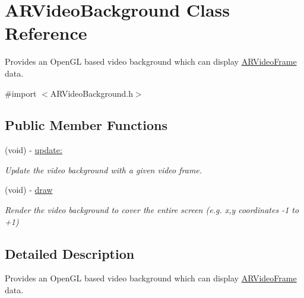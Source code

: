 \hypertarget{interface_a_r_video_background}{\section{A\-R\-Video\-Background Class Reference}
\label{interface_a_r_video_background}
}


Provides an Open\-G\-L based video background which can display \hyperlink{struct_a_r_video_frame}{A\-R\-Video\-Frame} data.  




{\ttfamily \#import $<$A\-R\-Video\-Background.\-h$>$}

\subsection*{Public Member Functions}
\begin{DoxyCompactItemize}
\item 
(void) -\/ \hyperlink{interface_a_r_video_background_a912dbfd42208bacb82411d537e80c8b9}{update\-:}
\begin{DoxyCompactList}\small\item\em Update the video background with a given video frame. \end{DoxyCompactList}\item 
\hypertarget{interface_a_r_video_background_a792429cb57d31b0dc84de1fac63e486c}{(void) -\/ \hyperlink{interface_a_r_video_background_a792429cb57d31b0dc84de1fac63e486c}{draw}}\label{interface_a_r_video_background_a792429cb57d31b0dc84de1fac63e486c}

\begin{DoxyCompactList}\small\item\em Render the video background to cover the entire screen (e.\-g. x,y coordinates -\/1 to +1) \end{DoxyCompactList}\end{DoxyCompactItemize}


\subsection{Detailed Description}
Provides an Open\-G\-L based video background which can display \hyperlink{struct_a_r_video_frame}{A\-R\-Video\-Frame} data. 

